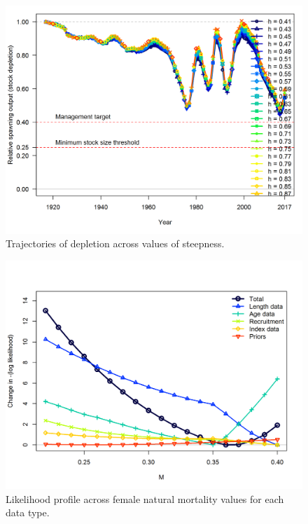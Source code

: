 \documentclass[12pt,]{article}
\begin{document}
\begin{figure}[htbp]
\centering
\includegraphics{Figures/profile_h_depl.png}
\caption{Trajectories of depletion across values of steepness.
\label{fig:profile_h_depl}}
\end{figure}

\begin{figure}[htbp]
\centering
\includegraphics{Figures/profile_m_like.png}
\caption{Likelihood profile across female natural mortality values for
each data type. \label{fig:profile_m_like}}
\end{figure}
\end{document}
